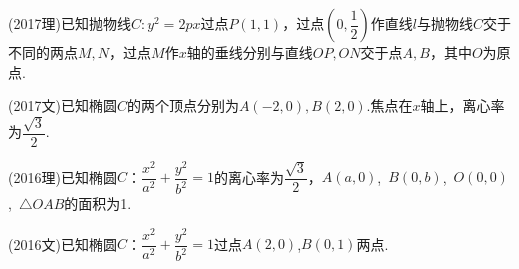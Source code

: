 \documentclass{BHCexam}
\begin{document}
\fubiaoti{}
\maketitle
\begin{questions}
\qs (2017理)已知抛物线$ C:y^2=2px $过点$ P\left(1,1\right) $，过点$ \left(0,\dfrac{1}{2}\right) $作直线$ l $与抛物线$ C $交于不同的两点$ M,N $，过点$ M $作$x$轴的垂线分别与直线$ OP,ON $交于点$ A,B $，其中$ O $为原点.
\kongbai 
\qs (2017文)已知椭圆$C$的两个顶点分别为$ A(-2,0),B(2,0) $.焦点在$x$轴上，离心率为$ \dfrac{\sqrt{3}}{2} $.
\newpage 
\question
(2016理)已知椭圆$C$：$\dfrac{x^2}{a^2}+\dfrac{y^2}{b^2}=1$的离心率为$\dfrac{\sqrt{3}}{2}$，$A(a,0)$,~$B(0,b)$,~$O(0,0)$,~$\triangle OAB$的面积为1.
\kongbai
\question
(2016文)已知椭圆$C$：$\dfrac{x^2}{a^2}+\dfrac{y^2}{b^2}=1$过点$A(2,0)$,$B(0,1)$两点.
\begin{parts}

\end{parts}
\end{questions}
\end{document}
